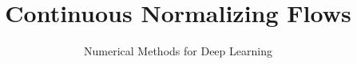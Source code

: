 \documentclass[12pt,fleqn,handout]{beamer}
\date{}
\title[CNF]{Continuous Normalizing Flows}
\subtitle{Numerical Methods for Deep Learning}
\begin{document}
\makebeamertitle
\end{document}
